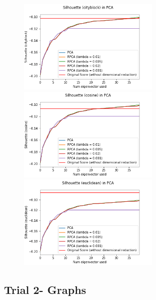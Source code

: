 \documentclass[11pt]{scrartcl} %
\theoremstyle{plain}
\begin{document}
\begin{figure}[H]
\centering
\includegraphics[width=0.6\textwidth]{figures/rpcatrial1cityblock.png}\\
\includegraphics[width=0.6\textwidth]{figures/rpcatrial1cosine.png}\\
\includegraphics[width=0.6\textwidth]{figures/rpcatrial1euclidean.png}\\
\end{figure}

\subsection{Trial 2- Graphs}
\end{document}
